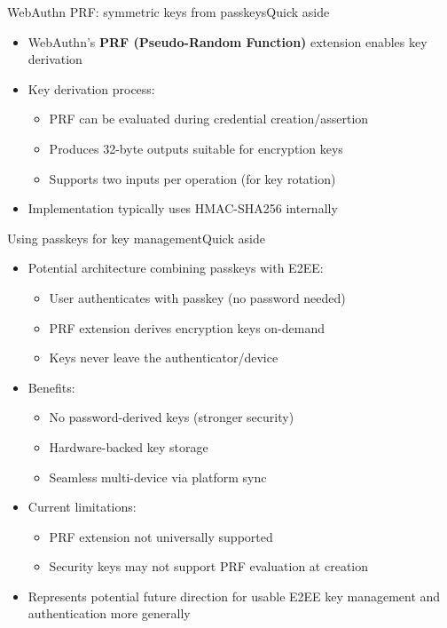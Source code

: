 \documentclass[aspectratio=169, lualatex, handout]{beamer}
\begin{document}
\begin{frame}{WebAuthn PRF: symmetric keys from passkeys}{Quick aside}
	\begin{itemize}
		\item WebAuthn's \textbf{PRF (Pseudo-Random Function)} extension enables key derivation
		\item Key derivation process:
		      \begin{itemize}
			      \item PRF can be evaluated during credential creation/assertion
			      \item Produces 32-byte outputs suitable for encryption keys
			      \item Supports two inputs per operation (for key rotation)
		      \end{itemize}
		\item Implementation typically uses HMAC-SHA256 internally
	\end{itemize}
\end{frame}

\begin{frame}{Using passkeys for key management}{Quick aside}
	\begin{itemize}
		\item Potential architecture combining passkeys with E2EE:
		      \begin{itemize}
			      \item User authenticates with passkey (no password needed)
			      \item PRF extension derives encryption keys on-demand
			      \item Keys never leave the authenticator/device
		      \end{itemize}
		\item Benefits:
		      \begin{itemize}
			      \item No password-derived keys (stronger security)
			      \item Hardware-backed key storage
			      \item Seamless multi-device via platform sync
		      \end{itemize}
		\item Current limitations:
		      \begin{itemize}
			      \item PRF extension not universally supported
			      \item Security keys may not support PRF evaluation at creation
		      \end{itemize}
		\item Represents potential future direction for usable E2EE key management and authentication more generally
	\end{itemize}
\end{frame}
\end{document}
